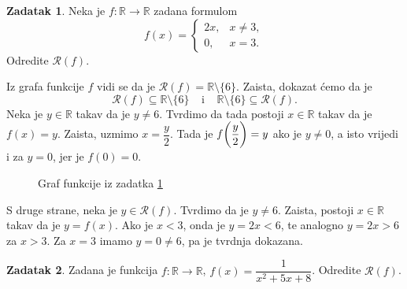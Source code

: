 \documentclass{book}
\let\originalleft\left
\let\originalright\right
\renewcommand{\left}{\mathopen{}\mathclose\bgroup\originalleft}
\renewcommand{\right}{\aftergroup\egroup\originalright}
\renewenvironment{proof}{%
    \vspace{-\parskip}\begin{oldproof}%
    }{%
    \end{oldproof}%
}
\theoremstyle{definition}
\theoremstyle{definition}
\newtheorem{exercise}{Zadatak}
\theoremstyle{remark}
\begin{document}
\begin{exercise}
\label{eximg}
Neka je $f : \mathbb{R}\to \mathbb{R}$ zadana formulom
$$f(x)=\begin{cases}
2x, & x\neq 3, \\
0, & x=3.
   \end{cases}$$
Odredite $\mathcal{R}(f)$.
\end{exercise}
\begin{proof}[Rješenje]
Iz grafa funkcije $f$ vidi se da je $\mathcal{R}(f)=\mathbb{R}\setminus \{6\}$. Zaista, dokazat ćemo da je $$\mathcal{R}(f)\subseteq \mathbb{R}\setminus \{6\}\;\;\;\;\text{i}\;\;\;\;\mathbb{R}\setminus \{6\}\subseteq \mathcal{R}(f).$$
Neka je $y\in \mathbb{R}$ takav da je $y\neq 6$. Tvrdimo da tada postoji $x\in \mathbb{R}$ takav da je $f(x)=y$. Zaista, uzmimo $x=\dfrac{y}{2}$. Tada je $f\left(\dfrac{y}{2}\right)=y$ ako je $y\neq 0$, a isto vrijedi i za $y=0$, jer je $f(0)=0$.
\begin{figure}[ht]
\begin{center}
\end{center}
\caption{\label{exim1} Graf funkcije iz zadatka \ref{eximg}}
\end{figure}

S druge strane, neka je $y\in \mathcal{R}(f)$. Tvrdimo da je $y\neq 6$. Zaista, postoji $x\in \mathbb{R}$ takav da je $y=f(x)$. Ako je $x<3$, onda je $y=2x<6$, te analogno $y=2x>6$ za $x>3$. Za $x=3$ imamo $y=0\neq 6$, pa je tvrdnja dokazana.
\end{proof}
\newpage
\begin{exercise}
\label{eximg2}
Zadana je funkcija $f : \mathbb{R}\to \mathbb{R}$, $f(x)=\dfrac{1}{x^2+5x+8}$. Odredite $\mathcal{R}(f)$.
\end{exercise}
\end{document}
